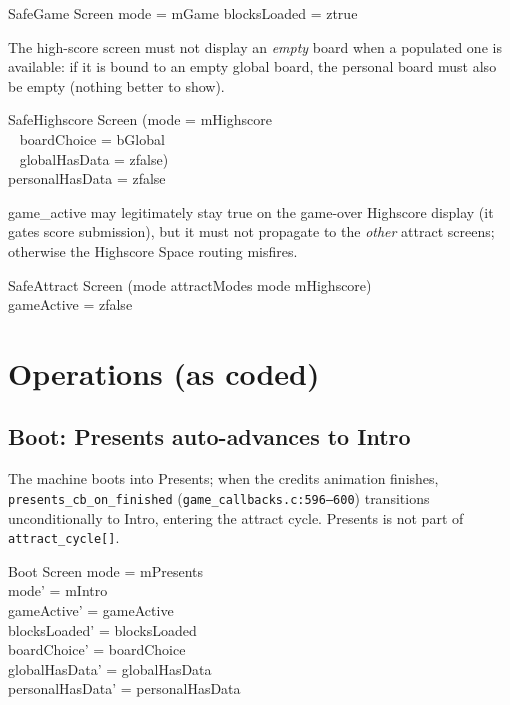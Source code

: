 \documentclass[a4paper,10pt,fleqn]{article}
\begin{document}
\begin{schema}{SafeGame}
  Screen
  \where
  mode = mGame \implies blocksLoaded = ztrue
\end{schema}

The high-score screen must not display an \emph{empty} board when a
populated one is available: if it is bound to an empty global board,
the personal board must also be empty (nothing better to show).

\begin{schema}{SafeHighscore}
  Screen
  \where
  (mode = mHighscore \\
    \quad~ \land boardChoice = bGlobal \\
  \quad~ \land globalHasData = zfalse) \\
  \implies personalHasData = zfalse
\end{schema}

\textsf{game\_active} may legitimately stay true on the game-over
\textsf{Highscore} display (it gates score submission), but it must
not propagate to the \emph{other} attract screens; otherwise the
\textsf{Highscore} \textsf{Space} routing misfires.

\begin{schema}{SafeAttract}
  Screen
  \where
  (mode \in attractModes \land mode \neq mHighscore) \\
  \implies gameActive = zfalse
\end{schema}

\section{Operations (as coded)}

\subsection{Boot: Presents auto-advances to Intro}

The machine boots into \textsf{Presents}; when the credits animation
finishes, \texttt{presents\_cb\_on\_finished}
(\texttt{game\_callbacks.c:596--600}) transitions unconditionally to
\textsf{Intro}, entering the attract cycle.  \textsf{Presents} is not
part of \texttt{attract\_cycle[]}.

\begin{schema}{Boot}
  \Delta Screen
  \where
  mode = mPresents \\
  mode' = mIntro \\
  gameActive' = gameActive \\
  blocksLoaded' = blocksLoaded \\
  boardChoice' = boardChoice \\
  globalHasData' = globalHasData \\
  personalHasData' = personalHasData
\end{schema}
\end{document}
